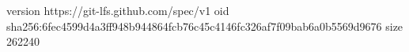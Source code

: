 version https://git-lfs.github.com/spec/v1
oid sha256:6fec4599d4a3ff948b944864fcb76c45c4146fc326af7f09bab6a0b5569d9676
size 262240

